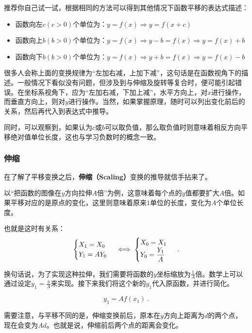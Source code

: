 推荐你自己试一试，根据相同的方法可以得到其他情况下函数平移的表达式描述：
\begin{itemize}
\item 函数向左$c(c>0)$个单位为：$y=f(x)\Rightarrow y=f(x+c)$
\item 函数向上$b(b>0)$个单位为：$y=f(x)\Rightarrow y-b=f(x)\Rightarrow y=f(x)+b$
\item 函数向下$b(b>0)$个单位为：$y=f(x)\Rightarrow y+b=f(x)\Rightarrow y=f(x)-b$
\end{itemize}

很多人会称上面的变换规律为“左加右减，上加下减”，这句话是在函数视角下的描述。一般情况下看似没有问题，但涉及到与伸缩及旋转等复合时，便可能引起错误。在坐标系视角下，应为“左加右减，下加上减”，水平方向上，对$x$进行操作，而垂直方向上，则对$y$进行操作。当然，如果掌握原理，随时可以列出变化前后的关系，然后再代入到表达式中推导。

同时，可以观察到，如果认为$c$或$b$可以取负值，那么取负值时则意味着相反方向平移绝对值单位长度，这也与学习负数时的概念一致。

\subsubsection{伸缩}

在了解了平移变换之后，\textbf{伸缩（Scaling）}变换的推导就信手拈来了。

以“把函数的图像在$y$方向拉伸$A$倍”为例，这意味着每个点的$y$值都要扩大$A$倍。如果平移对应的是原点的变化，这里则意味着原来$1$单位的长度，变化为$A$个单位长度。

也就是这时有关系：
\begin{equation}
\begin{cases}
X_1=X_0\\
Y_1=AY_0
\end{cases}\iff
\begin{cases}
X_0=X_1\\
\displaystyle Y_0={Y_1\over A}
\end{cases}~.
\end{equation}

换句话说，为了实现这种拉伸，我们需要将函数的$y$坐标缩放为$\displaystyle \frac{1}{A}$倍。数学上可以通过设定$\displaystyle y_1 = \frac{y}{A}$来实现。接下来我们将这个新的$y_1$代入原函数，并进行简化。

\begin{equation}
y_1=Af(x_1)~.
\end{equation}

需要注意，与平移不同的是，伸缩变换前后，原本在$y$方向上距离为$d$的两个点，现在会变为$Ad$。也就是说，伸缩前后两个点的距离会变化。

